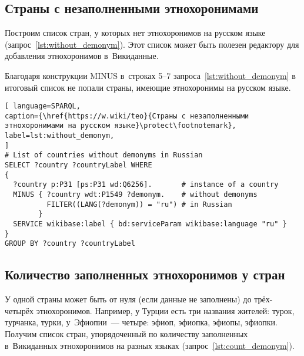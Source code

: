 \subsection{Страны с незаполненными этнохоронимами}

Построим список стран, у которых нет этнохоронимов на русском языке (запрос~\ref{lst:without_demonym}). 
Этот список может быть полезен редактору для добавления этнохоронимов в~Викиданные. 

Благодаря конструкции MINUS в~строках 5--7 запроса~\ref{lst:without_demonym} 
в итоговый список не попали страны, имеющие этнохоронимы на русском языке.

\newpage
{}
\begin{lstlisting}[ language=SPARQL, 
caption={\href{https://w.wiki/teo}{Страны с незаполненными этнохоронимами на русском языке}\protect\footnotemark},
label=lst:without_demonym, 
]
# List of countries without demonyms in Russian
SELECT ?country ?countryLabel WHERE
{
  ?country p:P31 [ps:P31 wd:Q6256].       # instance of a country
  MINUS { ?country wdt:P1549 ?demonym.    # without demonyms
          FILTER((LANG(?demonym)) = "ru") # in Russian
        }
  SERVICE wikibase:label { bd:serviceParam wikibase:language "ru" }
}
GROUP BY ?country ?countryLabel
\end{lstlisting}






\subsection{Количество заполненных этнохоронимов у стран}

У одной страны может быть от нуля (если данные не заполнены) до трёх-четырёх этнохоронимов. 
Например, у Турции есть три названия жителей: турок, турчанка, турки, 
у~Эфиопии~--- четыре: эфиоп, эфиопка, эфиопы, эфиопки.
Получим список стран, упорядоченный по количеству заполненных в~Викиданных этнохоронимов 
на разных языках (запрос~\ref{lst:count_demonym}). 

